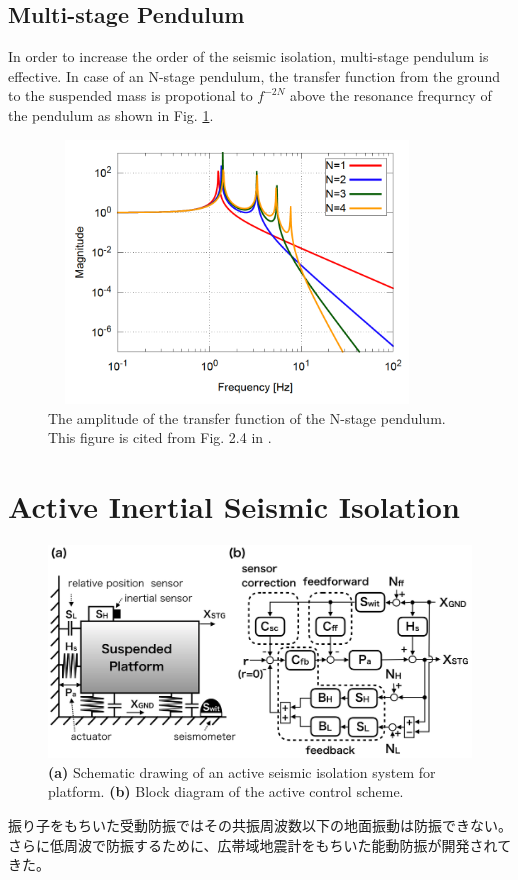\subsection{Multi-stage Pendulum}
In order to increase the order of the seismic isolation, multi-stage pendulum is effective. In case of an N-stage pendulum, the transfer function from the ground to the suspended mass is propotional to $f^{-2N}$ above the resonance frequrncy of the pendulum as shown in Fig. \ref{img:img502}. 
\begin{figure}[h]
  \begin{center}   
    \includegraphics[width=10cm,height=7cm]{./img_chap5/img502.png}
    \caption{The amplitude of the transfer function of the N-stage pendulum. This figure is cited from Fig. 2.4 in \cite{sekiguchi2016astudy}.} \label{img:img502}
  \end{center}
\end{figure}


\section{Active Inertial Seismic Isolation}\label{sec:512}
\begin{figure}[h]
  \begin{center}
    \includegraphics[width=13.5cm]{./img_chap5/img503.png}
    \caption{{\bf(a)} Schematic drawing of an active seismic isolation system for platform. {\bf(b)} Block diagram of the active control scheme.} \label{img:img503}
  \end{center}
\end{figure}
振り子をもちいた受動防振ではその共振周波数以下の地面振動は防振できない。さらに低周波で防振するために、広帯域地震計をもちいた能動防振が開発されてきた\cite{matichard2015seismic}。

